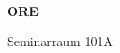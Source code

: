 \documentclass[a4paper]{article}
\begin{document}
\printGenericVSLHeader
\begin{center}
\begin{vsltext}{3cm}{4cm}

   \vspace{0.5cm} 

    \textbf{ORE} 

    \vspace{1.5cm}

    Seminarraum 101A

\end{vsltext}

\end{center}
\end{document}
